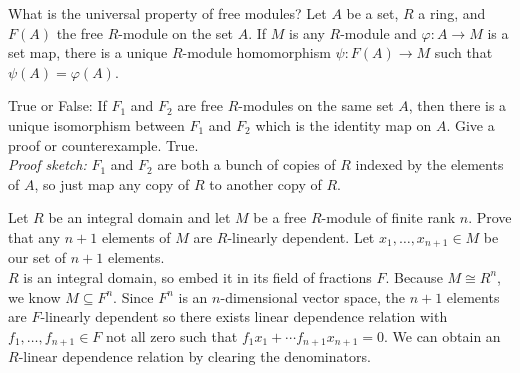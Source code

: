 \documentclass[avery5371,grid]{flashcards}
\let \phi \varphi
\begin{document}
\begin{flashcard}[Modules]{What is the universal property of free modules?}
 Let $A$ be a set, $R$ a ring, and $F(A)$ the free $R$-module on the set $A$. If $M$ is any $R$-module and $\phi: A \to M$ is a set map, there is a unique $R$-module homomorphism $\psi: F(A) \to M$ such that $\psi(A) = \phi(A)$.
 \begin{center}
 \end{center}
\end{flashcard}

\begin{flashcard}[Modules]{True or False: If $F_1$ and $F_2$ are free $R$-modules on the same set $A$, then there is a unique isomorphism between $F_1$ and $F_2$ which is the identity map on $A$. Give a proof or counterexample.}
 True.\\
 
 \emph{Proof sketch: }$F_1$ and $F_2$ are both a bunch of copies of $R$ indexed by the elements of $A$, so just map any copy of $R$ to another copy of $R$.
\end{flashcard}

\begin{flashcard}[Modules]{Let $R$ be an integral domain and let $M$ be a free $R$-module of finite rank $n$. Prove that any $n+1$ elements of $M$ are $R$-linearly dependent.}
 Let $x_1, \ldots, x_{n+1} \in M$ be our set of $n+1$ elements.\\
 
 $R$ is an integral domain, so embed it in its field of fractions $F$. Because $M \cong R^n$, we know $M \subseteq F^n$. Since $F^n$ is an $n$-dimensional vector space, the $n+1$ elements are $F$-linearly dependent so there exists linear dependence relation with $f_1, \ldots, f_{n+1} \in F$ not all zero such that $f_1 x_1 + \cdots f_{n+1} x_{n+1} = 0$. We can obtain an $R$-linear dependence relation by clearing the denominators.
\end{flashcard}
\end{document}
